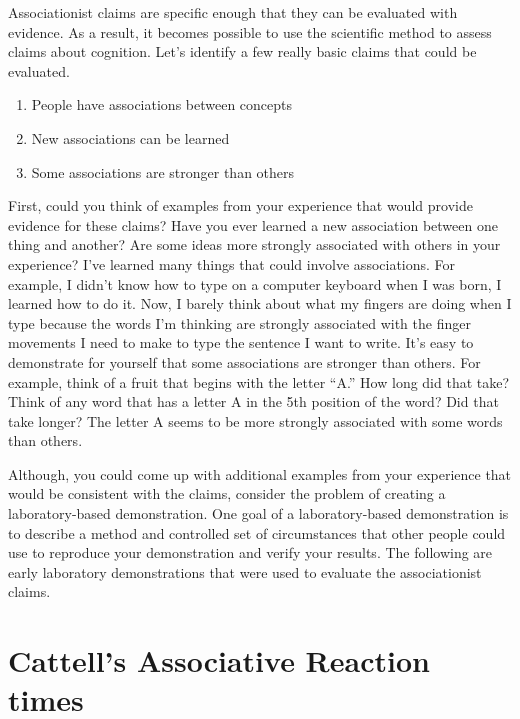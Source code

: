 \documentclass[
  oneside,
  12pt]{crumpbook}
\providecommand{\tightlist}{%
  \setlength{\itemsep}{0pt}\setlength{\parskip}{0pt}}
\begin{document}
Associationist claims are specific enough that they can be evaluated with evidence. As a result, it becomes possible to use the scientific method to assess claims about cognition. Let's identify a few really basic claims that could be evaluated.

\begin{enumerate}
\def\labelenumi{\arabic{enumi}.}
\tightlist
\item
  People have associations between concepts
\item
  New associations can be learned
\item
  Some associations are stronger than others
\end{enumerate}

First, could you think of examples from your experience that would provide evidence for these claims? Have you ever learned a new association between one thing and another? Are some ideas more strongly associated with others in your experience? I've learned many things that could involve associations. For example, I didn't know how to type on a computer keyboard when I was born, I learned how to do it. Now, I barely think about what my fingers are doing when I type because the words I'm thinking are strongly associated with the finger movements I need to make to type the sentence I want to write. It's easy to demonstrate for yourself that some associations are stronger than others. For example, think of a fruit that begins with the letter ``A.'' How long did that take? Think of any word that has a letter A in the 5th position of the word? Did that take longer? The letter A seems to be more strongly associated with some words than others.

Although, you could come up with additional examples from your experience that would be consistent with the claims, consider the problem of creating a laboratory-based demonstration. One goal of a laboratory-based demonstration is to describe a method and controlled set of circumstances that other people could use to reproduce your demonstration and verify your results. The following are early laboratory demonstrations that were used to evaluate the associationist claims.

\hypertarget{cattells-associative-reaction-times}{%
\section{Cattell's Associative Reaction times}\label{cattells-associative-reaction-times}}
\end{document}
